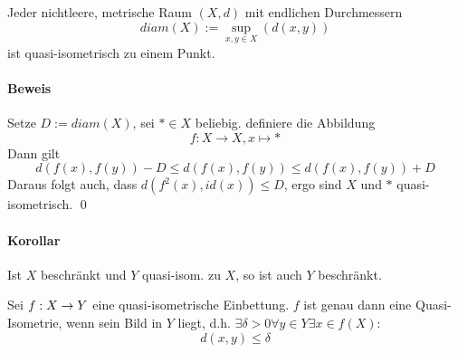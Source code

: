 \documentclass{article}
\begin{document}
Jeder nichtleere, metrische Raum $(X,d)$ mit endlichen Durchmessern
\[diam(X) := \sup_{x,y\in X}(d(x,y)) \]
ist quasi-isometrisch zu einem Punkt.
\paragraph{Beweis}
Setze $D:= diam(X)$, sei $* \in X$ beliebig. definiere die Abbildung
\[f:X \longrightarrow X, x \longmapsto *\]
Dann gilt
\[d(f(x), f(y)) - D \leq d(f(x),f(y)) \leq d(f(x),f(y)) + D \]
Daraus folgt auch, dass $d(f^2(x), id(x)) \leq D$, ergo sind $X$ und $*$ quasi-isometrisch.
\qed

\paragraph{Korollar}
Ist $X$ beschränkt und $Y$ quasi-isom. zu $X$, so ist auch $Y$ beschränkt.

Sei $f : X \overset{}{\rightarrow} Y$ eine quasi-isometrische Einbettung. $f$ ist genau dann eine Quasi-Isometrie, wenn sein Bild  in $Y$ liegt, d.h. $\exists \delta > 0 \forall y \in Y \exists x \in f(X):$
\[ d(x,y) \leq \delta \]
\end{document}
